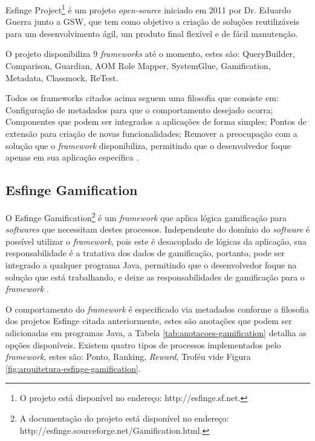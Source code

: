\par Esfinge Project\footnote{O projeto está disponível no endereço: http://esfinge.sf.net.} é um projeto \textit{open-source} iniciado em 2011 por Dr. Eduardo Guerra junto a GSW, que tem como objetivo a criação de soluções reutilizáveis para um desenvolvimento ágil, um produto final flexível e de fácil manutenção.
\par O projeto disponibiliza 9 \textit{frameworks} até o momento, estes são: QueryBuilder, Comparison, Guardian, AOM Role Mapper, SystemGlue, Gamification, Metadata, Classmock, ReTest.
\par Todos os frameworks citados acima seguem uma filosofia que consiste em: Configuração de metadados para que o comportamento desejado ocorra; Componentes que podem ser integrados a aplicações de forma simples; Pontos de extensão para criação de novas funcionalidades; Remover a preocupação com a solução que o \textit{framework} disponibiliza, permitindo que o desenvolvedor foque apenas em sua aplicação específica \cite{esfingeproject2011}.

\subsection{Esfinge Gamification}

\par O Esfinge Gamification\footnote{A documentação do projeto está disponível no endereço: http://esfinge.sourceforge.net/Gamification.html.} é um \textit{framework} que aplica lógica gamificação para \textit{softwares} que necessitam destes processos. Independente do domínio do \textit{software} é possível utilizar o \textit{framework}, pois este é desacoplado de lógicas da aplicação, sua responsabilidade é a tratativa dos dados de gamificação, portanto, pode ser integrado a qualquer programa Java, permitindo que o desenvolvedor foque na solução que está trabalhando, e deixe as responsabilidades de gamificação para o \textit{framework}  .


\par O comportamento do \textit{framework} é especificado via metadados conforme a filosofia dos projetos Esfinge citada anteriormente, estes são anotações que podem ser adicionadas em programas Java, a Tabela \ref{tab:anotacoes-gamification} detalha as opções disponíveis. Existem quatro tipos de processos implementados pelo \textit{framework}, estes são: Ponto, Ranking, \textit{Reward}, Troféu vide Figura \ref{fig:arquitetura-esfinge-gamification}.

